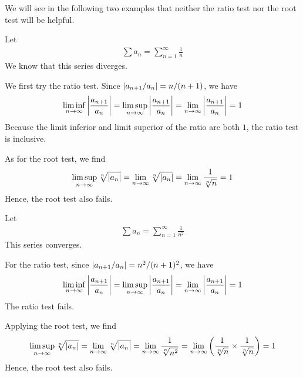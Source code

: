 \documentclass[thmcnt=section, 12pt]{my-elegantbook}
\begin{document}

We will see in the following two examples that neither the ratio test nor the root test will be helpful.

\begin{example}
    Let
    \begin{align*}
        \sum a_n = \sum_{n=1}^\infty \frac{1}{n}
    \end{align*}
    We know that this series diverges. 
    
    We first try the ratio test. Since $\left\lvert  a_{n+1} / a_n  \right\rvert = n / (n+1)$, we have 
    \begin{align*}
        \liminf_{n \to \infty} \left\lvert \frac{a_{n+1}}{a_n} \right\rvert 
        = \limsup_{n \to \infty} \left\lvert \frac{a_{n+1}}{a_n} \right\rvert
        = \lim_{n \to \infty} \left\lvert \frac{a_{n+1}}{a_n} \right\rvert
        = 1
    \end{align*}
    Because the limit inferior and limit superior of the ratio are both $1$, the ratio test is inclusive.

    As for the root test, we find 
    \begin{align*}
        \limsup_{n \to \infty} \sqrt[n]{\left\lvert a_n \right\rvert}
        = \lim_{n \to \infty} \sqrt[n]{\left\lvert a_n \right\rvert}
        = \lim_{n \to \infty} \frac{1}{\sqrt[n]{n}}
        = 1
    \end{align*}
    Hence, the root test also fails.
    \label{eg:7}
\end{example}

\begin{example}
    Let
    \begin{align*}
        \sum a_n = \sum_{n=1}^\infty \frac{1}{n^2}
    \end{align*}
    This series converges.
    
    For the ratio test, since $\left\lvert  a_{n+1} / a_n  \right\rvert = n^2 / (n+1)^2$, we have 
    \begin{align*}
        \liminf_{n \to \infty} \left\lvert \frac{a_{n+1}}{a_n} \right\rvert 
        = \limsup_{n \to \infty} \left\lvert \frac{a_{n+1}}{a_n} \right\rvert
        = \lim_{n \to \infty} \left\lvert \frac{a_{n+1}}{a_n} \right\rvert
        = 1
    \end{align*}
    The ratio test fails.

    Applying the root test, we find
    \begin{align*}
        \limsup_{n \to \infty} \sqrt[n]{\left\lvert a_n \right\rvert}
        = \lim_{n \to \infty} \sqrt[n]{\left\lvert a_n \right\rvert}
        = \lim_{n \to \infty} \frac{1}{\sqrt[n]{n^2}}
        = \lim_{n \to \infty} \left( \frac{1}{\sqrt[n]{n}} \times \frac{1}{\sqrt[n]{n}} \right)
        = 1
    \end{align*}
    Hence, the root test also fails.
    \label{eg:8}
\end{example}
\end{document}
